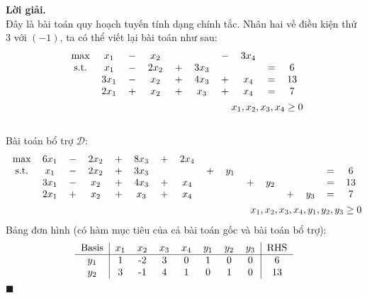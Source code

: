 \documentclass[12pt]{article}
\newenvironment{solution}{%
     \setlength\parindent{0pt}\par\medskip\textbf{Lời giải.}\quad}{%
     \hfill\tiny$\blacksquare$\par\medskip}
\begin{document}
    \begin{solution}
        \\
        Đây là bài toán quy hoạch tuyến tính dạng chính tắc. Nhân hai vế điều kiện thứ 3 với $(-1)$, ta có thể viết lại bài toán như sau:
        \begin{align*}
            \begin{tabular}{cccccccccc}
                \text{max} & $x_1$ & $-$ & $x_2$ & & & $-$ & $3x_4$ \\
                \text{s.t.} & $x_1$ & $-$ & $2x_2$ & $+$ & $3x_3$ & & & $=$ & $6$ \\
                & $3x_1$ & $-$ & $x_2$ & $+$ & $4x_3$ & $+$ & $x_4$ & $=$ & $13$ \\
                & $2x_1$ & $+$ & $x_2$ & $+$ & $x_3$ & $+$ & $x_4$ & $=$ & $7$ \\
            \end{tabular}
            \\
            x_1, x_2, x_3, x_4 \geq 0
        \end{align*}
        \\
        Bài toán bổ trợ $\mathscr{D}$:
        \begin{align*}
            \begin{tabular}{cccccccccccccccc}
                \text{max} & $6x_1$ & $-$ & $2x_2$ & $+$ & $8x_3$ & $+$ & $2x_4$ \\
                \text{s.t.} & $x_1$ & $-$ & $2x_2$ & $+$ & $3x_3$ & & & $+$ & $y_1$ & & & & & $=$ & $6$ \\
                & $3x_1$ & $-$ & $x_2$ & $+$ & $4x_3$ & $+$ & $x_4$ & & & $+$ & $y_2$ & & & $=$ & $13$ \\
                & $2x_1$ & $+$ & $x_2$ & $+$ & $x_3$ & $+$ & $x_4$ & & & & & $+$ & $y_3$ & $=$ & $7$ \\
            \end{tabular}
            \\
            x_1, x_2, x_3, x_4 , y_1, y_2, y_3 \geq 0
        \end{align*}
        Bảng đơn hình (có hàm mục tiêu của cả bài toán gốc và bài toán bổ trợ):
        \begin{align*}
            \begin{tabular}{c|ccccccc|c}
                \text{Basis} & $x_1$ & $x_2$ & $x_3$ & $x_4$ & $y_1$ & $y_2$ & $y_3$ & RHS \\ \hline
                $y_1$ & 1 & -2 & 3 & 0 & 1 & 0 & 0 & 6 \\
                $y_2$ & 3 & -1 & 4 & 1 & 0 & 1 & 0 & 13 \\

\end{tabular}
\end{align*}
\end{solution}
\end{document}
